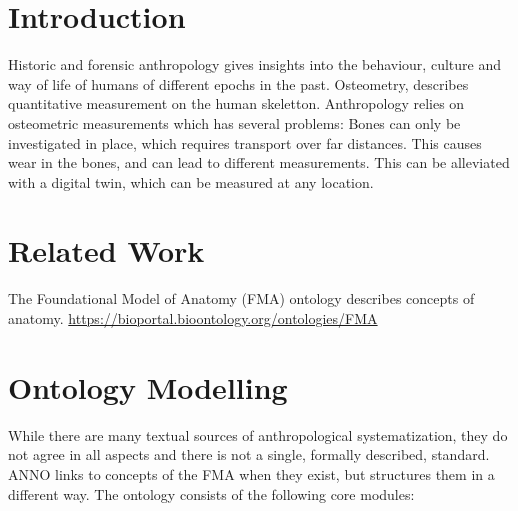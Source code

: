 \documentclass[sw]{iosart2x}
\newcommand{\aw}{AnthroWorks3D}
\begin{document}
\begin{frontmatter}
\begin{abstract}
Anthropology relies on osteometric measurements of human bones, but ...
In this paper, first, we describe the anthropology domain.
Then, we discuss design decisions of modelling ANNO.
Next, we show how ANNO is published for the community.
Finally, we describe the integration of the ontology into \aw.
\end{abstract}

\begin{keyword}
\end{keyword}

\end{frontmatter}


\section{Introduction}\label{sec:introduction}
Historic and forensic anthropology gives insights into the behaviour, culture and way of life of humans of different epochs in the past.
Osteometry, describes quantitative measurement on the human skeletton.
Anthropology relies on osteometric measurements which has several problems:
Bones can only be investigated in place, which requires transport over far distances.
This causes wear in the bones, and can lead to different measurements.
This can be alleviated with a digital twin, which can be measured at any location.

\section{Related Work}
The Foundational Model of Anatomy (FMA) ontology \cite{fma} describes concepts of anatomy.
\url{https://bioportal.bioontology.org/ontologies/FMA}

\section{Ontology Modelling}
While there are many textual sources of anthropological systematization, they do not agree in all aspects and there is not a single, formally described, standard.
ANNO links to concepts of the FMA when they exist, but structures them in a different way.
The ontology consists of the following core modules:
\end{document}

